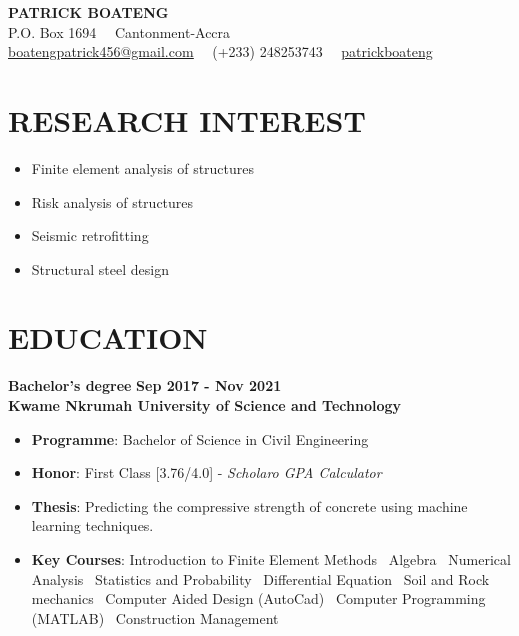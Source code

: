 \documentclass[letterpaper, 12pt]{article}
\newcommand{\cvsection}[1]{
	
	\section*{#1}
}
\newcommand{\verticalSpace}{4pt}
\begin{document}
	
	
	\begin{center}
		
	{\huge{\textbf{PATRICK BOATENG}}} \\ [\verticalSpace]
	
	P.O. Box 1694 \, \vrule \, Cantonment-Accra \\ [\verticalSpace]
	
	\faEnvelope \space \href{mailto:boatengpatrick456@gmail.com}{\underline{boatengpatrick456@gmail.com}}
	\, \vrule \,
	\faPhone \space (+233) 248253743
	\, \vrule \,
	 \faGithub \space \href{https://www.github.com/patrickboateng}{\underline{patrickboateng}}
	
	\end{center}
	
	
	\cvsection{RESEARCH INTEREST}
	
	\begin{itemize}[leftmargin=*]
		
		\item Finite element analysis of structures
		\item Risk analysis of structures
		\item Seismic retrofitting
		\item Structural steel design
		
	\end{itemize}
	
	
	\cvsection{EDUCATION} 	
	
	\textbf{Bachelor's degree} \hfill \textbf{Sep 2017 - Nov 2021} \\ [\verticalSpace]
	\textbf{Kwame Nkrumah University of Science and Technology}
	
	\begin{itemize}[leftmargin=*]
		
		\item \textbf{Programme}: Bachelor of Science in Civil Engineering
		\item \textbf{Honor}: First Class [3.76/4.0] - \textit{Scholaro GPA Calculator}
		\item \textbf{Thesis}: Predicting the compressive strength of concrete using machine learning techniques.
		\item \textbf{Key Courses}: Introduction to Finite Element Methods \vrule \, Algebra \vrule \, Numerical Analysis \vrule \, Statistics and Probability \vrule \, Differential Equation \vrule \, Soil and Rock mechanics \vrule \, Computer Aided Design (AutoCad) \vrule \, Computer Programming (MATLAB) \vrule \, Construction Management
	
	\end{itemize}
	
\end{document}
